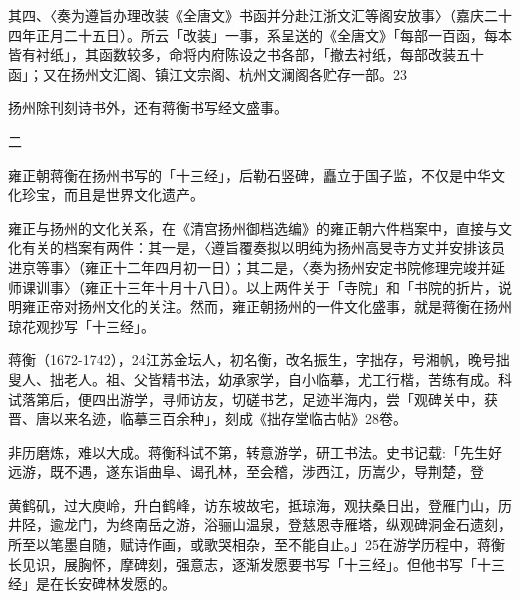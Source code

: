 其四、〈奏为遵旨办理改装《全唐文》书函并分赴江浙文汇等阁安放事〉（嘉庆二十四年正月二十五日）。所云「改装」一事，系呈送的《全唐文》「每部一百函，每本皆有衬纸」，其函数较多，命将内府陈设之书各部，「撤去衬纸，每部改装五十函」；又在扬州文汇阁、镇江文宗阁、杭州文澜阁各贮存一部。23

扬州除刊刻诗书外，还有蒋衡书写经文盛事。

二

雍正朝蒋衡在扬州书写的「十三经」，后勒石竖碑，矗立于国子监，不仅是中华文化珍宝，而且是世界文化遗产。

雍正与扬州的文化关系，在《清宫扬州御档选编》的雍正朝六件档案中，直接与文化有关的档案有两件：其一是，〈遵旨覆奏拟以明纯为扬州高旻寺方丈并安排该员进京等事〉（雍正十二年四月初一日）；其二是，〈奏为扬州安定书院修理完竣并延师课训事〉（雍正十三年十月十八日）。以上两件关于「寺院」和「书院的折片，说明雍正帝对扬州文化的关注。然而，雍正朝扬州的一件文化盛事，就是蒋衡在扬州琼花观抄写「十三经」。

蒋衡（1672-1742），24江苏金坛人，初名衡，改名振生，字拙存，号湘帆，晚号拙叟人、拙老人。祖、父皆精书法，幼承家学，自小临摹，尤工行楷，苦练有成。科试落第后，便四出游学，寻师访友，切磋书艺，足迹半海内，尝「观碑关中，获晋、唐以来名迹，临摹三百余种」，刻成《拙存堂临古帖》28卷。

非历磨炼，难以大成。蒋衡科试不第，转意游学，研工书法。史书记载:「先生好远游，既不遇，遂东诣曲阜、谒孔林，至会稽，涉西江，历嵩少，导荆楚，登

\vfill
\begin{BookNotes}
\end{BookNotes}

\noindent 黄鹤矶，过大庾岭，升白鹤峰，访东坡故宅，抵琼海，观扶桑日出，登雁门山，历井陉，逾龙门，为终南岳之游，浴骊山温泉，登慈恩寺雁塔，纵观碑洞金石遗刻，所至以笔墨自随，赋诗作画，或歌哭相杂，至不能自止。」25在游学历程中，蒋衡长见识，展胸怀，摩碑刻，强意志，逐渐发愿要书写「十三经」。但他书写「十三经」是在长安碑林发愿的。

